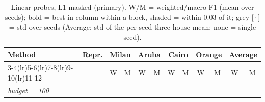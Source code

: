\begin{table}[H]
\centering\small
\caption{Linear probes, L1 masked (primary). W/M = weighted/macro F1 (mean over seeds); bold = best in column within a block, shaded = within 0.03 of it; grey [\,$\cdot$\,] = std over seeds (Average: std of the per-seed three-house mean; none = single seed).}
\label{tab:probe_l1_masked}
\setlength{\tabcolsep}{3.2pt}
\begin{tabular}{llcc|cc|cc|cc|cc}
\toprule
Method & Repr. & \multicolumn{2}{c}{Milan} & \multicolumn{2}{c}{Aruba} & \multicolumn{2}{c}{Cairo} & \multicolumn{2}{c}{Orange} & \multicolumn{2}{c}{Average} \\
\cmidrule(lr){3-4}\cmidrule(lr){5-6}\cmidrule(lr){7-8}\cmidrule(lr){9-10}\cmidrule(lr){11-12}
 & & W & M & W & M & W & M & W & M & W & M \\
\midrule
\multicolumn{12}{l}{\textit{budget = 100}} \\
\midrule

\end{tabular}
\end{table}
